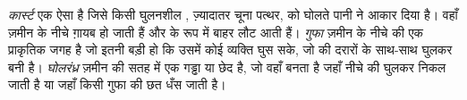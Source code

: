 \begin{definition}[कार्स्ट, गुफा और घोलरंध्र]\label{def:g9:landforms:karst}
\emph{कार्स्ट} एक ऐसा  है जिसे किसी घुलनशील , ज़्यादातर चूना
पत्थर, को घोलते पानी ने आकार दिया है। वहाँ  ज़मीन के नीचे ग़ायब हो जाती हैं और  के
रूप में बाहर लौट आती हैं। \emph{गुफा} ज़मीन के नीचे की एक प्राकृतिक जगह है
जो इतनी बड़ी हो कि उसमें कोई व्यक्ति घुस सके, जो  की दरारों के साथ-साथ घुलकर बनी है।
\emph{घोलरंध्र} ज़मीन की सतह में एक गड्ढा या छेद है, जो वहाँ बनता है जहाँ
नीचे की  घुलकर निकल जाती है या जहाँ किसी गुफा की छत धँस जाती
है।
\end{definition}

